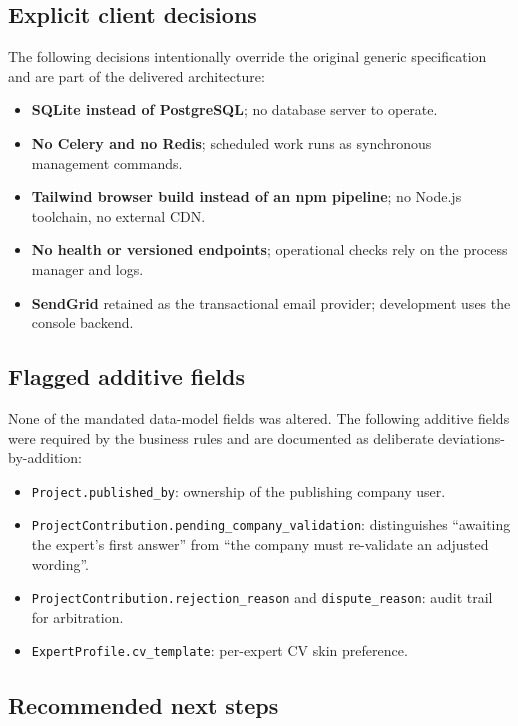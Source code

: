 \documentclass[11pt,a4paper]{article}
\begin{document}
\subsection{Explicit client decisions}

The following decisions intentionally override the original generic
specification and are part of the delivered architecture:

\begin{itemize}[leftmargin=1.4em,itemsep=3pt]
  \item \textbf{SQLite instead of PostgreSQL}; no database server to operate.
  \item \textbf{No Celery and no Redis}; scheduled work runs as synchronous
        management commands.
  \item \textbf{Tailwind browser build instead of an npm pipeline}; no Node.js
        toolchain, no external CDN.
  \item \textbf{No health or versioned endpoints}; operational checks rely on
        the process manager and logs.
  \item \textbf{SendGrid} retained as the transactional email provider;
        development uses the console backend.
\end{itemize}

\subsection{Flagged additive fields}

None of the mandated data-model fields was altered. The following additive
fields were required by the business rules and are documented as deliberate
deviations-by-addition:

\begin{itemize}[leftmargin=1.4em,itemsep=3pt]
  \item \texttt{Project.published\_by}: ownership of the publishing company user.
  \item \texttt{ProjectContribution.pending\_company\_validation}: distinguishes
        ``awaiting the expert's first answer'' from ``the company must
        re-validate an adjusted wording''.
  \item \texttt{ProjectContribution.rejection\_reason} and
        \texttt{dispute\_reason}: audit trail for arbitration.
  \item \texttt{ExpertProfile.cv\_template}: per-expert CV skin preference.
\end{itemize}

\subsection{Recommended next steps}
\end{document}
